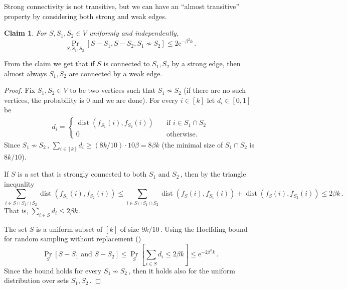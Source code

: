 \documentclass[11pt]{article}
\numberwithin{equation}{section}
\newtheorem{claim}[theorem]{Claim}
\theoremstyle{definition}
\theoremstyle{plain}
\newcommand{\eee}{\mathrm e}
\newcommand{\Prob}[2][]{\Pr_{{#1}}\left[#2\right]} %
\newcommand\f{f} %
\DeclareMathOperator{\dist}{dist} %
\newcommand\wconn{\sim} %
\newcommand\sconn{-} %
\begin{document}
Strong connectivity is not transitive, but we can have an ``almost transitive'' property by considering both strong and weak edges.
\begin{claim} \label{claim:no triangle}
	For $S,S_1,S_2\in V$ uniformly and independently,
	\[\Prob[S,S_1,S_2]{S\sconn S_1,S\sconn S_2,S_1\not\wconn S_2} \leq 2\eee^{-\beta^2 k}\,.\]%
\end{claim}
From the claim we get that if $S$ is connected to $S_1,S_2$ by a strong edge, then almost always $S_1,S_2$ are connected by a weak edge.
\begin{proof}
	Fix $S_1,S_2\in V$ to be two vertices such that $S_1\not\wconn S_2$ (if there are no such vertices, the probability is $0$ and we are done).
    For every $i\in[k]$ let $d_i\in[0,1]$ be
    \begin{align*}
    d_i = 
    \begin{cases}
    \dist(\f_{S_1}(i),\f_{S_2}(i)) \quad &\textrm{if }i\in S_1\cap S_2\\
    0  \quad &\textrm{otherwise.}
    \end{cases}
    \end{align*}
    Since $S_1\not\wconn S_2$\,, $\sum_{i\in [k]}d_i \geq 
    (8k/10) %
    \cdot 10\beta = 8\beta k $ (the minimal size of $S_1\cap S_2$ is 
    $8k/10$). %
    
    If $S$ is a set that is strongly connected to both $S_1$ and $S_2$\,, then by the triangle inequality
    \[ \sum_{i\in S\cap S_1 \cap S_2} \dist(\f_{S_1}(i),\f_{S_2}(i)) \leq \sum_{i\in S\cap S_1 \cap S_2}\dist(\f_{S}(i),\f_{S_1}(i))+\dist(\f_{S}(i),\f_{S_2}(i))\leq 2\beta k\,. \]%
    That is, $\sum_{i\in S}d_i\leq 2\beta k$\,.

    The set $S$ is a uniform subset of $[k]$ of size $9k/10$\,. Using
%
the Hoeffding   %
bound for random
%
 sampling without replacement ()  %
\[  \Prob[S]{S\sconn S_1 \textrm{ and  } S\sconn S_2}\leq\Prob[S]{\sum_{i\in S}d_i \leq 2\beta k}\leq  \eee^{-2\beta^2 k}\,.\]%
	Since the bound holds for every $S_1\not\wconn S_2$\,, then it holds also for the uniform distribution over sets $S_1,S_2$\,.
\end{proof}
\end{document}

